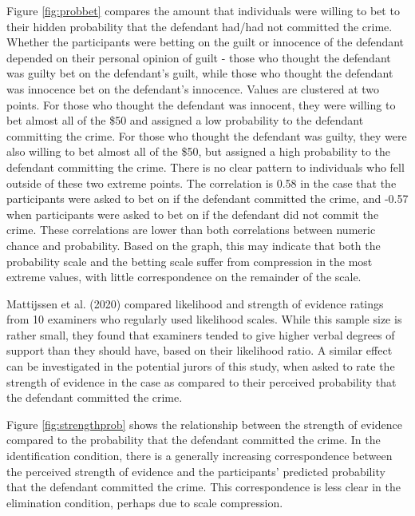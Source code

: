 \documentclass[print]{nuthesis}
\begin{document}
Figure \ref{fig:probbet} compares the amount that individuals were willing to bet to their hidden probability that the defendant had/had not committed the crime.
Whether the participants were betting on the guilt or innocence of the defendant depended on their personal opinion of guilt - those who thought the defendant was guilty bet on the defendant's guilt, while those who thought the defendant was innocence bet on the defendant's innocence.
Values are clustered at two points.
For those who thought the defendant was innocent, they were willing to bet almost all of the \$50 and assigned a low probability to the defendant committing the crime.
For those who thought the defendant was guilty, they were also willing to bet almost all of the \$50, but assigned a high probability to the defendant committing the crime.
There is no clear pattern to individuals who fell outside of these two extreme points.
The correlation is 0.58 in the case that the participants were asked to bet on if the defendant committed the crime, and -0.57 when participants were asked to bet on if the defendant did not commit the crime.
These correlations are lower than both correlations between numeric chance and probability.
Based on the graph, this may indicate that both the probability scale and the betting scale suffer from compression in the most extreme values, with little correspondence on the remainder of the scale.

Mattijssen et al. (2020) compared likelihood and strength of evidence ratings from 10 examiners who regularly used likelihood scales.
While this sample size is rather small, they found that examiners tended to give higher verbal degrees of support than they should have, based on their likelihood ratio.
A similar effect can be investigated in the potential jurors of this study, when asked to rate the strength of evidence in the case as compared to their perceived probability that the defendant committed the crime.

Figure \ref{fig:strengthprob} shows the relationship between the strength of evidence compared to the probability that the defendant committed the crime.
In the identification condition, there is a generally increasing correspondence between the perceived strength of evidence and the participants' predicted probability that the defendant committed the crime.
This correspondence is less clear in the elimination condition, perhaps due to scale compression.
\end{document}

